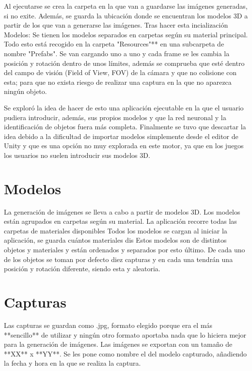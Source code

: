Al ejecutarse se crea la carpeta en la que van a guardarse las imágenes generadas, si no exite. Además, se guarda la ubicación donde se encuentran los modelos 3D a partir de los que van a generarse las imágenes. Tras hacer esta incialización
		Modelos:
Se tienen los modelos separados en carpetas según su material principal. Todo esto está recogido en la carpeta "Resources"** en una subcarpeta de nombre "Prefabs". Se van cargando uno a uno y cada frame se les cambia la posición y rotación dentro de unos límites, además se comprueba que esté dentro del campo de visión (Field of View, FOV) de la cámara y que no colisione con esta; para que no exista riesgo de realizar una captura en la que no aparezca ningún objeto. 


Se exploró la idea de hacer de esto una aplicación ejecutable en la que el usuario pudiera introducir, además, sus propios modelos y que la red neuronal y la identificación de objetos fuera más completa. Finalmente se tuvo que descartar la idea debido a la dificultad de importar modelos simplemente desde el editor de Unity y que es una opción no muy explorada en este motor, ya que en los juegos los usuarios no suelen introducir sus modelos 3D.


\section{Modelos}
\label{cap3:sec:modelos}

La generación de imágenes se lleva a cabo a partir de modelos 3D. Los modelos están agrupados en carpetas según su material.
La aplicación recorre todas las carpetas de materiales disponibles
 Todos los modelos se cargan al iniciar la aplicación, se guarda cuántos materiales dis Estos modelos son de distintos objetos y materiales y están ordenados y separados por esto último. 
De cada uno de los objetos se toman por defecto diez capturas y en cada una tendrán una posición y rotación diferente, siendo esta y aleatoria.

\section{Capturas}
\label{cap3:sec:capturas}

Las capturas se guardan como .jpg, formato elegido porque era el más **sencillo** de utilizar y ningún otro formato aportaba nada que lo hiciera mejor para la generación de imágenes. Las imágenes se exportan con un tamaño de **XX** x **YY**. Se les pone como nombre el  del modelo capturado, añadiendo la fecha y hora en la que se realiza la captura. 

